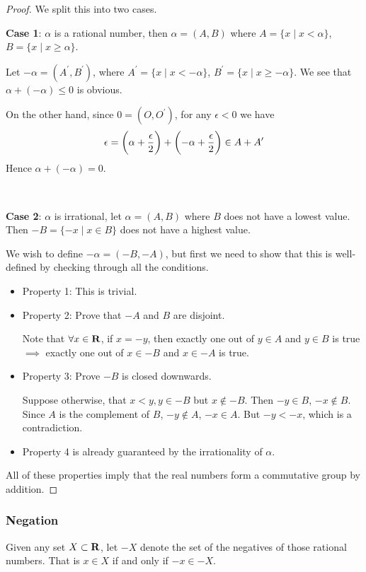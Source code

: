 \begin{proof}
We split this into two cases.

\textbf{Case 1}: $\alpha$ is a rational number, then $\alpha=(A,B)$ where $A = \{x \mid x < \alpha\}$, $B = \{x \mid x \ge \alpha\}$.

Let $-\alpha=(A^\prime,B^\prime)$, where $A^\prime = \{x \mid x < -\alpha\}$, $B^\prime = \{x \mid x\ge -\alpha\}$. 
We see that $\alpha+(-\alpha) \le 0$ is obvious.

On the other hand, since $0=(O,O^\prime)$, for any $\epsilon<0$ we have
\[ \epsilon = \left(\alpha+\frac{\epsilon}{2}\right) + \left(-\alpha+\frac{\epsilon}{2}\right) \in A+A^\prime \]
Hence $\alpha+(-\alpha)=0$.

\

\textbf{Case 2}: $\alpha$ is irrational, let $\alpha = (A,B)$ where $B$ does not have a lowest value. 
Then $-B = \{-x \mid x \in B\}$ does not have a highest value.

We wish to define $-\alpha=(-B,-A)$, but first we need to show that this is well-defined by checking through all the conditions.

\begin{itemize}
\item Property 1: This is trivial.

\item Property 2: Prove that $- A$ and $B$ are disjoint.

Note that $\forall x \in \mathbf R$, if $x=-y$, then exactly one out of $y \in A$ and $y \in B$ is true $\implies$ exactly one out of $x \in -B$ and $x \in -A$ is true.

\item Property 3: Prove $-B$ is closed downwards.

Suppose otherwise, that $x<y, y \in -B$ but $x \notin -B$. Then $-y \in B$, $-x \notin B$. Since $A$ is the complement of $B$, $-y \notin A$, $-x \in A$. But $-y<-x$, which is a contradiction.

\item Property 4 is already guaranteed by the irrationality of $\alpha$.
\end{itemize}

All of these properties imply that the real numbers form a commutative group by addition.
\end{proof}

\subsubsection{Negation}
Given any set $X \subset \mathbf R$, let $-X$ denote the set of the negatives of those rational numbers. That is $x \in X$ if and only if $-x \in -X$. 

